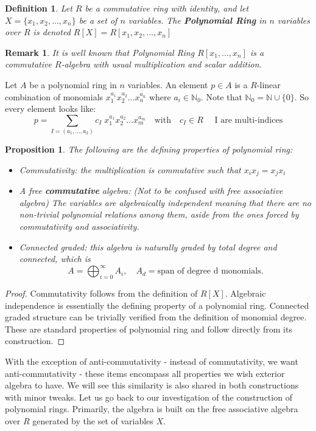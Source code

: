 \documentclass[12pt]{article}
\newtheorem{proposition}[theorem]{Proposition}
\newtheorem{definition}[theorem]{Definition}
\newtheorem{remark}[theorem]{Remark}
\numberwithin{theorem}{section}
\numberwithin{equation}{theorem}
\begin{document}
\begin{definition}
Let $R$ be a commutative ring with identity, and let $X = \{x_1, x_2, ..., x_n\}$ be a set of $n$ variables. The \textbf{Polynomial Ring} in $n$ variables over $R$ is denoted $R[X] = R[x_1, x_2, ..., x_n]$
\end{definition}
\begin{remark}
    It is well known that Polynomial Ring $R[x_1, ..., x_n]$ is a commutative $R$-algebra with usual multiplication and scalar addition.
\end{remark}

Let $A$ be a polynomial ring in $n$ variables. An element $p \in A$ is a $R$-linear combination of monomials $x_1^{a_1}x_2^{a_2}...x_n^{a_n} \text{ where } a_i \in \mathbb{N}_0$. Note that $\mathbb{N}_0 = \mathbb{N} \cup \{0\}$.
So every element looks like:
$$p = \sum_{I=(a_1, ..., a_2)} c_I \; x_1^{a_1}x_2^{a_2}...x_m^{a_m} \quad \text{with} \quad c_I \in R \quad \text{ I are multi-indices}$$

\begin{proposition}
The following are the defining properties of polynomial ring:
\begin{itemize}
    \item Commutativity: the multiplication is commutative such that $x_ix_j = x_jx_i$
    \item A free \textbf{commutative} algebra: (Not to be confused with free associative algebra) The variables are algebraically independent meaning that there are no non-trivial polynomial relations among them, aside from the ones forced by commutativity and associativity.
    \item Connected graded: this algebra is naturally graded by total degree and connected, which is $$A = \bigoplus^\infty_{i = 0}A_i, \quad A_d = \text{span of degree d monomials.}$$
\end{itemize}
\end{proposition}
\begin{proof}
    Commutativity follows from the definition of $R[X]$. Algebraic independence is essentially the defining property of a polynomial ring. Connected graded structure can be trivially verified from the definition of monomial degree. These are standard properties of polynomial ring and follow directly from its construction. 
\end{proof}

With the exception of anti-commutativity - instead of commutativity, we want anti-commutativity - these items encompass all properties we wish exterior algebra to have. We will see this similarity is also shared in both constructions with minor tweaks. Let us go back to our investigation of the construction of polynomial rings.
Primarily, the algebra is built on the free associative algebra over $R$ generated by the set of variables $X$.
\newline
\end{document}
